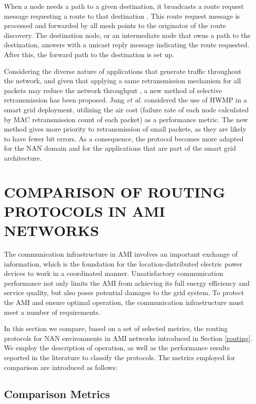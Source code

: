\documentclass[10pt,twocolumn,twoside,submit]{JCNtran}
\begin{document}
When a node needs a path to a given destination, it broadcasts a route request message requesting a route to that destination \cite{Bahr2006}. This route request message is processed and forwarded by all mesh points to the originator of the route discovery. The destination node, or an intermediate node that owns a path to the destination, answers with a unicast reply message indicating the route requested. After this, the forward path to the destination is set up. 

Considering the diverse nature of applications that generate traffic throughout the network, and given that applying a same retransmission mechanism for all packets may reduce the network throughput \cite{Meng2014}, a new method of selective retransmission has been proposed. Jung \textit{et al.} \cite{Jung2011} considered the use of HWMP in a smart grid deployment, utilizing the air cost (failure rate of each node calculated by MAC retransmission count of each packet) as a performance metric. The new method gives more priority to retransmission of small packets, as they are likely to have fewer bit errors. As a consequence, the protocol becomes more adapted for the NAN domain and for the applications that are part of the smart grid architecture. 

\vspace{10pt}
\section{\uppercase{Comparison of routing protocols in AMI networks}}
\label{sec:metrics}

The communication infrastructure in AMI involves an important exchange of information, which is the foundation for the location-distributed electric power devices to work in a coordinated manner. Unsatisfactory communication performance not only limits the AMI from achieving its full energy efficiency and service quality, but also poses potential damages to the grid system. To protect the AMI and ensure optimal operation, the communication infrastructure must meet a number of requirements.

In this section we compare, based on a set of selected metrics, the routing protocols for NAN environments in AMI networks introduced in Section \ref{routing}. We employ the description of operation, as well as the performance results reported in the literature to classify the protocols. The metrics employed for comparison are introduced as follows:

\subsection{Comparison Metrics}
\end{document}
